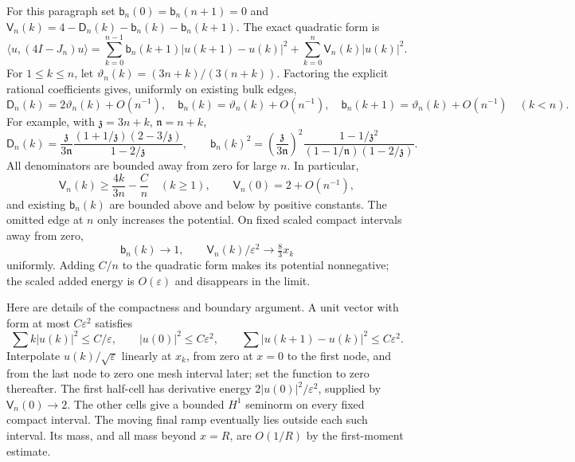 \documentclass[11pt,letterpaper]{article}
\newcommand{\ip}[2]{\langle#1,#2\rangle}
\newcommand{\eps}{\varepsilon}
\theoremstyle{remark}
\begin{document}
For this paragraph set $\mathsf b_n(0)=\mathsf b_n(n+1)=0$ and
$\mathsf V_n(k)=4-\mathsf D_n(k)-\mathsf b_n(k)-\mathsf b_n(k+1)$. The exact quadratic form is
\begin{equation}\label{tcn:w:form}
 \ip{u}{(4I-J_n)u}
 =\sum_{k=0}^{n-1}\mathsf b_n(k+1)|u(k+1)-u(k)|^2
    +\sum_{k=0}^n\mathsf V_n(k)|u(k)|^2.
\end{equation}
For $1\le k\le n$, let $\vartheta_n(k)=(3n+k)/(3(n+k))$. Factoring the explicit rational coefficients gives, uniformly on existing bulk edges,
\[
 \mathsf D_n(k)=2\vartheta_n(k)+O(n^{-1}),\quad
 \mathsf b_n(k)=\vartheta_n(k)+O(n^{-1}),\quad
 \mathsf b_n(k+1)=\vartheta_n(k)+O(n^{-1})\quad(k<n).
\]
For example, with $\mathfrak z=3n+k$, $\mathfrak n=n+k$,
\[
 \mathsf D_n(k)=\frac{\mathfrak z}{3\mathfrak n}\frac{(1+1/\mathfrak z)(2-3/\mathfrak z)}{1-2/\mathfrak z},\qquad
 \mathsf b_n(k)^2=\left(\frac{\mathfrak z}{3\mathfrak n}\right)^2
        \frac{1-1/\mathfrak z^2}{(1-1/\mathfrak n)(1-2/\mathfrak z)}.
\]
All denominators are bounded away from zero for large $n$. In particular,
\begin{equation}\label{tcn:w:potential}
 \mathsf V_n(k)\ge\frac{4k}{3n}-\frac Cn\quad(k\ge1),\qquad \mathsf V_n(0)=2+O(n^{-1}),
\end{equation}
and existing $\mathsf b_n(k)$ are bounded above and below by positive constants. The omitted edge at $n$ only increases the potential. On fixed scaled compact intervals away from zero,
\[
 \mathsf b_n(k)\longrightarrow1,\qquad \mathsf V_n(k)/\eps^2\longrightarrow\tfrac83x_k
\]
uniformly. Adding $C/n$ to the quadratic form makes its potential nonnegative; the scaled added energy is $O(\eps)$ and disappears in the limit.

Here are details of the compactness and boundary argument. A unit vector with form at most $C\eps^2$ satisfies
\[
 \sum k|u(k)|^2\le C/\eps,\qquad |u(0)|^2\le C\eps^2,\qquad
 \sum|u(k+1)-u(k)|^2\le C\eps^2.
\]
Interpolate $u(k)/\sqrt\eps$ linearly at $x_k$, from zero at $x=0$ to the first node, and from the last node to zero one mesh interval later; set the function to zero thereafter. The first half-cell has derivative energy $2|u(0)|^2/\eps^2$, supplied by $\mathsf V_n(0)\to2$. The other cells give a bounded $H^1$ seminorm on every fixed compact interval. The moving final ramp eventually lies outside each such interval. Its mass, and all mass beyond $x=R$, are $O(1/R)$ by the first-moment estimate.
\end{document}
